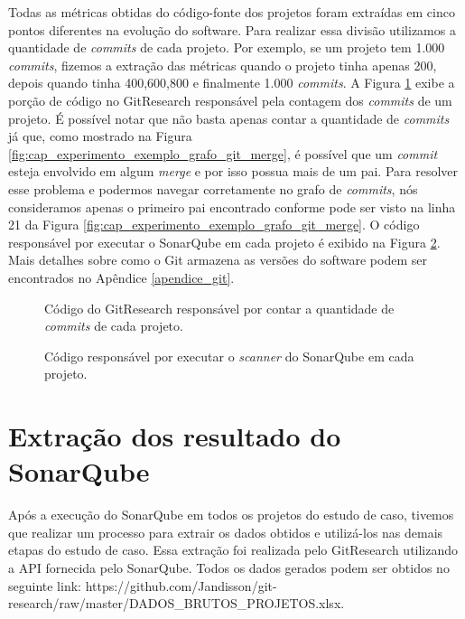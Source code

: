 Todas as métricas obtidas do código-fonte dos projetos foram extraídas em cinco pontos diferentes na evolução do software.  Para realizar essa divisão utilizamos a quantidade de \textit{commits} de cada projeto. Por exemplo, se um projeto tem 1.000 \textit{commits}, fizemos a extração das métricas quando o projeto tinha apenas 200, depois quando tinha 400,600,800 e finalmente 1.000 \textit{commits}.  A Figura \ref{fig:codigo_conta_commits} exibe a porção de código no GitResearch responsável pela contagem dos \textit{commits} de um projeto. É possível notar que não basta apenas contar a quantidade de \textit{commits} já que, como mostrado na Figura \ref{fig:cap_experimento_exemplo_grafo_git_merge}, é possível que um \textit{commit} esteja envolvido em algum \textit{merge} e por isso possua mais de um pai. Para resolver esse problema e podermos navegar corretamente no grafo de \textit{commits}, nós consideramos apenas o primeiro pai encontrado conforme pode ser visto na linha 21 da Figura \ref{fig:cap_experimento_exemplo_grafo_git_merge}. O código responsável por executar o SonarQube em cada projeto é exibido na Figura \ref{fig:codigo_executa_sonar}. Mais detalhes sobre como o Git armazena as versões do software podem ser encontrados no Apêndice \ref{apendice_git}.

 \begin{figure}[H]
  \centering
  \caption{Código do GitResearch responsável por contar a quantidade de \textit{commits} de cada projeto.}
  \label{fig:codigo_conta_commits} 
\end{figure}

 \begin{figure}[H]
  \centering
  \caption{Código responsável por executar o \textit{scanner} do SonarQube em cada projeto.}
  \label{fig:codigo_executa_sonar} 
\end{figure}

\section{Extração dos resultado do SonarQube}

Após a execução do SonarQube em todos os projetos do estudo de caso, tivemos que realizar um processo para extrair os dados obtidos e utilizá-los nas demais etapas do estudo de caso. Essa extração foi realizada pelo GitResearch utilizando a API fornecida pelo SonarQube. Todos os dados gerados podem ser obtidos no seguinte link: https://github.com/Jandisson/git-research/raw/master/DADOS\_BRUTOS\_PROJETOS.xlsx.





